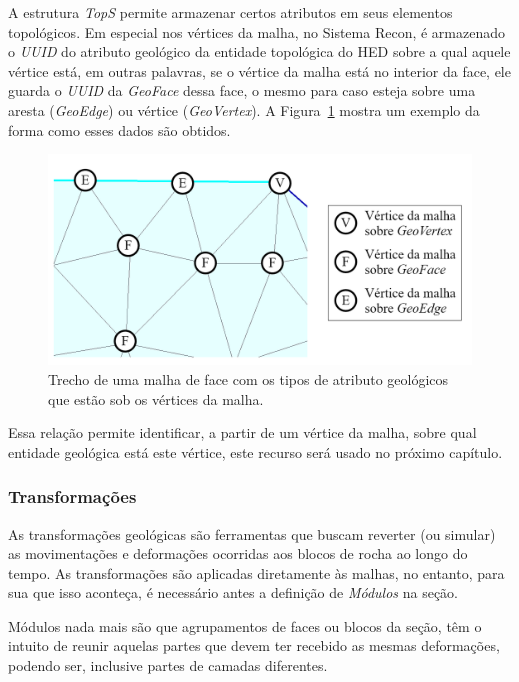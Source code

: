A estrutura \textit{TopS} permite armazenar certos atributos em seus elementos topológicos. Em especial nos vértices da malha, no Sistema Recon, é armazenado o \textit{UUID} do atributo geológico da entidade topológica do HED sobre a qual aquele vértice está, em outras palavras, se o vértice da malha está no interior da face, ele guarda o \textit{UUID} da \textit{GeoFace} dessa face, o mesmo para caso esteja sobre uma aresta (\textit{GeoEdge}) ou vértice (\textit{GeoVertex}). A Figura~\ref{fig-recon-4} mostra um exemplo da forma como esses dados são obtidos.

\begin{figure} [H]
  \begin{center}
    \includegraphics[width=\textwidth]{images/fig-recon-4}
    \caption{Trecho de uma malha de face com os tipos de atributo geológicos que estão sob os vértices da malha.}\label{fig-recon-4}
  \end{center}
\end{figure}

Essa relação permite identificar, a partir de um vértice da malha, sobre qual entidade geológica está este vértice, este recurso será usado no próximo capítulo.

\subsubsection{Transformações}

As transformações geológicas são ferramentas que buscam reverter (ou simular) as movimentações e deformações ocorridas aos blocos de rocha ao longo do tempo.\cite{Santi} As transformações são aplicadas diretamente às malhas, no entanto, para sua que isso aconteça, é necessário antes a definição de \textit{Módulos} na seção. 

Módulos nada mais são que agrupamentos de faces ou blocos da seção, têm o intuito de reunir aquelas partes que devem ter recebido as mesmas deformações, podendo ser, inclusive partes de camadas diferentes.

